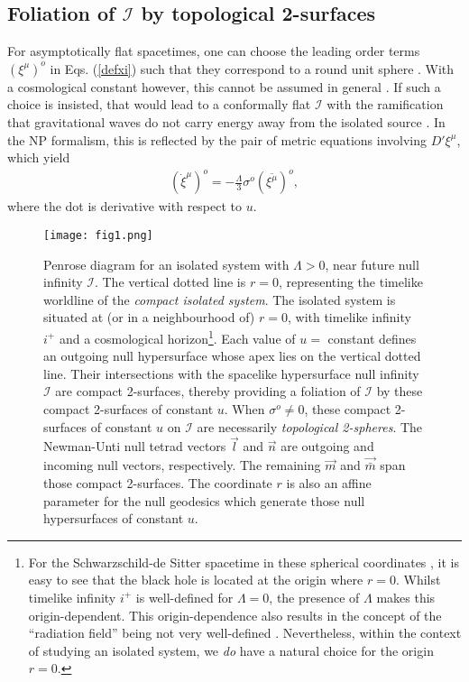 \documentclass[aps,pre,preprint,superscriptaddress,showpacs,showkeys]{revtex4-1}
\begin{document}
\subsection{Foliation of $\mathcal{I}$ by topological 2-surfaces}\label{Section2C}

For asymptotically flat spacetimes, one can choose the leading order terms $(\xi^{\mu})^o$ in Eqs. (\ref{defxi}) such that they correspond to a round unit sphere \cite{newunti62}. With a cosmological constant however, this cannot be assumed in general \cite{Szabados}. If such a choice is insisted, that would lead to a conformally flat $\mathcal{I}$ with the ramification that gravitational waves do not carry energy away from the isolated source \cite{ash1}. In the NP formalism, this is reflected by the pair of metric equations involving $D'\xi^\mu$, which yield \cite{Vee2016}
\begin{eqnarray}\label{xi}
(\dot{\xi}^\mu)^o=-\frac{\Lambda}{3}\sigma^o(\overline{\xi^\mu})^o,
\end{eqnarray}
where the dot is derivative with respect to $u$.

\begin{figure}
\centering
\texttt{[image: fig1.png]}
\caption{Penrose diagram for an isolated system with $\Lambda>0$, near future null infinity $\mathcal{I}$. The vertical dotted line is $r=0$, representing the timelike worldline of the \emph{compact isolated system}. The isolated system is situated at (or in a neighbourhood of) $r=0$, with timelike infinity $i^+$ and a cosmological horizon\footnote{For the Schwarzschild-de Sitter spacetime in these spherical coordinates \cite{Vee2016,GP}, it is easy to see that the black hole is located at the origin where $r=0$. Whilst timelike infinity $i^+$ is well-defined for $\Lambda=0$, the presence of $\Lambda$ makes this origin-dependent. This origin-dependence also results in the concept of the ``radiation field'' being not very well-defined \cite{Pen88}. Nevertheless, within the context of studying an isolated system, we \emph{do} have a natural choice for the origin $r=0$.}. Each value of $u=$ constant defines an outgoing null hypersurface whose apex lies on the vertical dotted line. Their intersections with the spacelike hypersurface null infinity $\mathcal{I}$ are compact 2-surfaces, thereby providing a foliation of $\mathcal{I}$ by these compact 2-surfaces of constant $u$. When $\sigma^o\neq0$, these compact 2-surfaces of constant $u$ on $\mathcal{I}$ are necessarily \emph{topological 2-spheres}. The Newman-Unti null tetrad vectors $\vec{l}$ and $\vec{n}$ are outgoing and incoming null vectors, respectively. The remaining $\vec{m}$ and $\vec{\bar{m}}$ span those compact 2-surfaces. The coordinate $r$ is also an affine parameter for the null geodesics which generate those null hypersurfaces of constant $u$.}
\label{fig1}
\end{figure}
\end{document}
